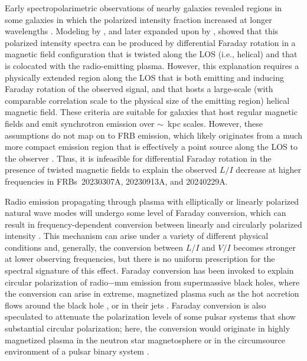 \documentclass[twocolumn, linenumbers]{aastex701}
\begin{document}
Early spectropolarimetric observations of nearby galaxies revealed regions in some galaxies in which the polarized intensity fraction increased at longer wavelengths \citep[e.g., in L-band observations of NGC~6946 and M51, respectively;][]{1991A&A...251...15B, 1992A&A...265..417H}. Modeling by \cite{1998MNRAS.299..189S}, and later expanded upon by \cite{2014MNRAS.441.2049H}, showed that this polarized intensity spectra can be produced by differential Faraday rotation in a magnetic field configuration that is twisted along the LOS (i.e., helical) and that is colocated with the radio-emitting plasma. However, this explanation requires a physically extended region along the LOS that is both emitting and inducing Faraday rotation of the observed signal, and that hosts a large-scale (with comparable correlation scale to the physical size of the emitting region) helical magnetic field. These criteria are suitable for galaxies that host regular magnetic fields and emit synchrotron emission over $\sim$~kpc scales. However, these assumptions do not map on to FRB emission, which likely originates from a much more compact emission region that is effectively a point source along the LOS to the observer \citep[e.g.][]{2025Natur.637...48N}. Thus, it is infeasible for differential Faraday rotation in the presence of twisted magnetic fields to explain the observed $L/I$ decrease at higher frequencies in FRBs~20230307A, 20230913A, and 20240229A.

Radio emission propagating through plasma with elliptically or linearly polarized natural wave modes will undergo some level of Faraday conversion, which can result in frequency-dependent conversion between linearly and circularly polarized intensity \citep{1969SvA....13..396S, 1998PASA...15..211K}. This mechanism can arise under a variety of different physical conditions \citep[e.g.,][]{2010ApJ...725.1600M, 2019ApJ...876...74G, 2019MNRAS.485L..78V, 2022ApJ...933L...6L} and, generally, the conversion between $L/I$ and $V/I$ becomes stronger at lower observing frequencies, but there is no uniform prescription for the spectral signature of this effect. Faraday conversion has been invoked to explain circular polarization of radio$-$mm emission from supermassive black holes, where the conversion can arise in extreme, magnetized plasma such as the hot accretion flows around the black hole \citep[e.g., in Sgr A*;][]{2011MNRAS.416.2574H}, or in their jets \citep[][]{2003Ap&SS.288..143W, 2018ApJ...862...58M}. Faraday conversion is also speculated to attenuate the polarization levels of some pulsar systems that show substantial circular polarization; here, the conversion would originate in highly magnetized plasma in the neutron star magnetosphere \citep{2004A&A...421..681E, 2019MNRAS.483.2778I, 2024NatAs...8..606L} or in the circumsource environment of a pulsar binary system \citep{2023Natur.618..484L}. 
\end{document}

